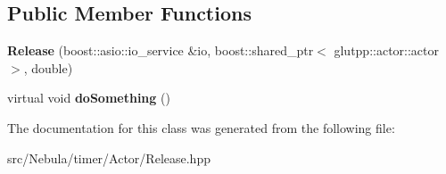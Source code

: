 \subsection*{Public Member Functions}
\begin{DoxyCompactItemize}
\item 
\hypertarget{classneb_1_1Timer_1_1Actor_1_1Release_aa6ad6ac8cf6b278825d5c66580c5b2fb}{{\bfseries Release} (boost\-::asio\-::io\-\_\-service \&io, boost\-::shared\-\_\-ptr$<$ glutpp\-::actor\-::actor $>$, double)}\label{classneb_1_1Timer_1_1Actor_1_1Release_aa6ad6ac8cf6b278825d5c66580c5b2fb}

\item 
\hypertarget{classneb_1_1Timer_1_1Actor_1_1Release_aba04f2d6b58f14b55dde7c0f1edeca20}{virtual void {\bfseries do\-Something} ()}\label{classneb_1_1Timer_1_1Actor_1_1Release_aba04f2d6b58f14b55dde7c0f1edeca20}

\end{DoxyCompactItemize}


The documentation for this class was generated from the following file\-:\begin{DoxyCompactItemize}
\item 
src/\-Nebula/timer/\-Actor/Release.\-hpp\end{DoxyCompactItemize}
